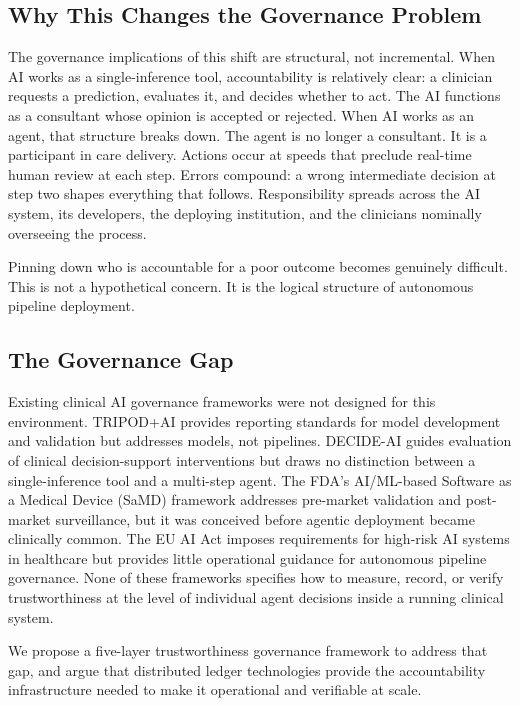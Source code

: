 \documentclass[12pt,a4paper]{article}
\begin{document}
\subsection*{Why This Changes the Governance Problem}

The governance implications of this shift are structural, not
incremental. When AI works as a single-inference tool,
accountability is relatively clear: a clinician requests a
prediction, evaluates it, and decides whether to act. The AI
functions as a consultant whose opinion is accepted or rejected.
When AI works as an agent, that structure breaks down.
The agent is no longer a consultant. It is a participant in care
delivery. Actions occur at speeds that preclude real-time human
review at each step. Errors compound: a wrong intermediate
decision at step two shapes everything that follows. Responsibility
spreads across the AI system, its developers, the deploying
institution, and the clinicians nominally overseeing the process.

Pinning down who is accountable for a poor outcome becomes
genuinely difficult. This is not a hypothetical concern. It is
the logical structure of autonomous pipeline deployment.

\subsection*{The Governance Gap}

Existing clinical AI governance frameworks were not designed for
this environment. TRIPOD+AI\cite{collins2024tripod} provides
reporting standards for model development and validation but
addresses models, not pipelines. DECIDE-AI\cite{vasey2022} guides
evaluation of clinical decision-support interventions but draws no
distinction between a single-inference tool and a multi-step
agent. The FDA's AI/ML-based Software as a Medical Device (SaMD)
framework\cite{fda2021} addresses pre-market validation and
post-market surveillance, but it was conceived before agentic
deployment became clinically common. The EU AI
Act\cite{euaiact2024} imposes requirements for high-risk AI
systems in healthcare but provides little operational guidance for
autonomous pipeline governance. None of these frameworks specifies
how to measure, record, or verify trustworthiness at the level of
individual agent decisions inside a running clinical system.

We propose a five-layer trustworthiness governance framework to
address that gap, and argue that distributed ledger technologies
provide the accountability infrastructure needed to make it
operational and verifiable at scale.
\end{document}
